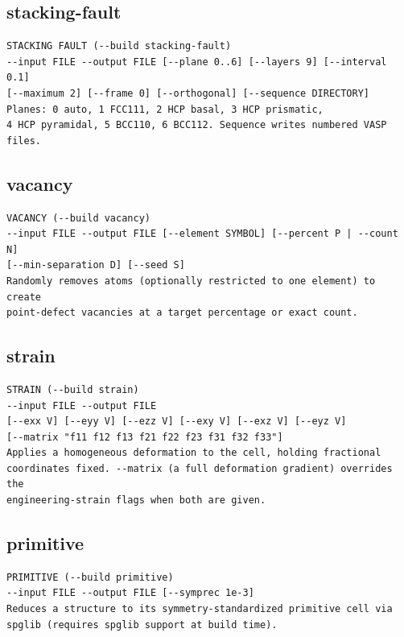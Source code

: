\clearpage

\subsection{stacking-fault}

\begin{lstlisting}
STACKING FAULT (--build stacking-fault)
--input FILE --output FILE [--plane 0..6] [--layers 9] [--interval 0.1]
[--maximum 2] [--frame 0] [--orthogonal] [--sequence DIRECTORY]
Planes: 0 auto, 1 FCC111, 2 HCP basal, 3 HCP prismatic,
4 HCP pyramidal, 5 BCC110, 6 BCC112. Sequence writes numbered VASP files.
\end{lstlisting}

\clearpage

\subsection{vacancy}

\begin{lstlisting}
VACANCY (--build vacancy)
--input FILE --output FILE [--element SYMBOL] [--percent P | --count N]
[--min-separation D] [--seed S]
Randomly removes atoms (optionally restricted to one element) to create
point-defect vacancies at a target percentage or exact count.
\end{lstlisting}

\clearpage

\subsection{strain}

\begin{lstlisting}
STRAIN (--build strain)
--input FILE --output FILE
[--exx V] [--eyy V] [--ezz V] [--exy V] [--exz V] [--eyz V]
[--matrix "f11 f12 f13 f21 f22 f23 f31 f32 f33"]
Applies a homogeneous deformation to the cell, holding fractional
coordinates fixed. --matrix (a full deformation gradient) overrides the
engineering-strain flags when both are given.
\end{lstlisting}

\clearpage

\subsection{primitive}

\begin{lstlisting}
PRIMITIVE (--build primitive)
--input FILE --output FILE [--symprec 1e-3]
Reduces a structure to its symmetry-standardized primitive cell via
spglib (requires spglib support at build time).
\end{lstlisting}

